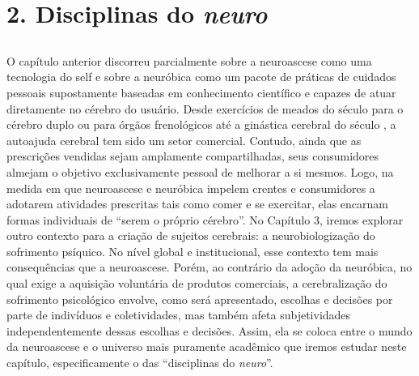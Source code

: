 \part{2. Disciplinas do \emph{neuro}}

\chapter*{}

O capítulo anterior discorreu parcialmente sobre a neuroascese como uma
tecnologia do self e sobre a neuróbica como um pacote de práticas de
cuidados pessoais supostamente baseadas em conhecimento científico e
capazes de atuar diretamente no cérebro do usuário. Desde exercícios de
meados do século  para o cérebro duplo ou para órgãos frenológicos
até a ginástica cerebral do século , a autoajuda cerebral tem sido um
setor comercial. Contudo, ainda que as prescrições vendidas sejam
amplamente compartilhadas, seus consumidores almejam o objetivo
exclusivamente pessoal de melhorar a si mesmos. Logo, na medida em que
neuroascese e neuróbica impelem crentes e consumidores a adotarem
atividades prescritas tais como comer e se exercitar, elas encarnam
formas individuais de ``serem o próprio cérebro''. No Capítulo 3, iremos
explorar outro contexto para a criação de sujeitos cerebrais: a
neurobiologização do sofrimento psíquico. No nível global e
institucional, esse contexto tem mais consequências que a neuroascese.
Porém, ao contrário da adoção da neuróbica, no qual exige a aquisição
voluntária de produtos comerciais, a cerebralização do sofrimento
psicológico envolve, como será apresentado, escolhas e decisões por
parte de indivíduos e coletividades, mas também afeta subjetividades
independentemente dessas escolhas e decisões. Assim, ela se coloca entre
o mundo da neuroascese e o universo mais puramente acadêmico que iremos
estudar neste capítulo, especificamente o das ``disciplinas do
\emph{neuro}''.

